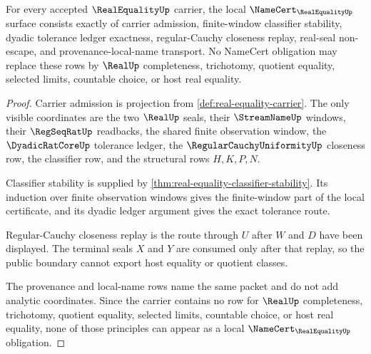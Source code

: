 \begin{theorem}
\label{thm:real-equality-namecert-boundary}
For every accepted $\RealEqualityUp$ carrier, the local $\NameCert_{\RealEqualityUp}$ surface consists exactly of carrier admission, finite-window classifier stability, dyadic tolerance ledger exactness, regular-Cauchy closeness replay, real-seal non-escape, and provenance-local-name transport. No NameCert obligation may replace these rows by $\RealUp$ completeness, trichotomy, quotient equality, selected limits, countable choice, or host real equality.
\end{theorem}
\begin{proof}
Carrier admission is projection from \autoref{def:real-equality-carrier}. The only visible coordinates are the two $\RealUp$ seals, their $\StreamNameUp$ windows, their $\RegSeqRatUp$ readbacks, the shared finite observation window, the $\DyadicRatCoreUp$ tolerance ledger, the $\RegularCauchyUniformityUp$ closeness row, the classifier row, and the structural rows $H,K,P,N$.

Classifier stability is supplied by \autoref{thm:real-equality-classifier-stability}. Its induction over finite observation windows gives the finite-window part of the local certificate, and its dyadic ledger argument gives the exact tolerance route.

Regular-Cauchy closeness replay is the route through $U$ after $W$ and $D$ have been displayed. The terminal seals $X$ and $Y$ are consumed only after that replay, so the public boundary cannot export host equality or quotient classes.

The provenance and local-name rows name the same packet and do not add analytic coordinates. Since the carrier contains no row for $\RealUp$ completeness, trichotomy, quotient equality, selected limits, countable choice, or host real equality, none of those principles can appear as a local $\NameCert_{\RealEqualityUp}$ obligation.
\end{proof}

